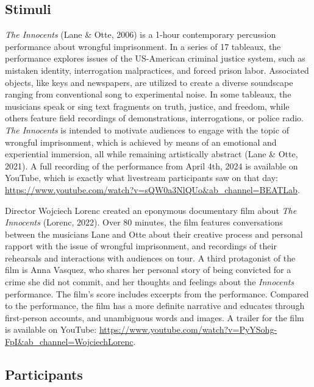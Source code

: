 \documentclass[
  man,floatsintext]{apa6}
\begin{document}
\subsection{Stimuli}\label{stimuli}

\textit{The Innocents} (Lane \& Otte, 2006) is a 1-hour contemporary percussion performance about wrongful imprisonment. In a series of 17 tableaux, the performance explores issues of the US-American criminal justice system, such as mistaken identity, interrogation malpractices, and forced prison labor. Associated objects, like keys and newspapers, are utilized to create a diverse soundscape ranging from conventional song to experimental noise. In some tableaux, the musicians speak or sing text fragments on truth, justice, and freedom, while others feature field recordings of demonstrations, interrogations, or police radio. \textit{The Innocents} is intended to motivate audiences to engage with the topic of wrongful imprisonment, which is achieved by means of an emotional and experiential immersion, all while remaining artistically abstract (Lane \& Otte, 2021). A full recording of the performance from April 4th, 2024 is available on YouTube, which is exactly what livestream participants saw on that day: \url{https://www.youtube.com/watch?v=sQW0a3NlQUo&ab_channel=BEATLab}.

Director Wojciech Lorenc created an eponymous documentary film about \textit{The Innocents} (Lorenc, 2022). Over 80 minutes, the film features conversations between the musicians Lane and Otte about their creative process and personal rapport with the issue of wrongful imprisonment, and recordings of their rehearsals and interactions with audiences on tour. A third protagonist of the film is Anna Vasquez, who shares her personal story of being convicted for a crime she did not commit, and her thoughts and feelings about the \textit{Innocents} performance. The film's score includes excerpts from the performance. Compared to the performance, the film has a more definite narrative and educates through first-person accounts, and unambiguous words and images. A trailer for the film is available on YouTube: \url{https://www.youtube.com/watch?v=PyYSohg-FpI&ab_channel=WojciechLorenc}.

\subsection{Participants}\label{participants}
\end{document}
